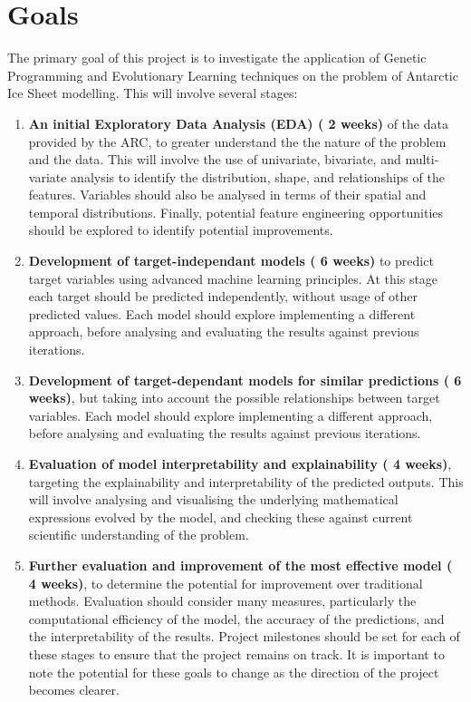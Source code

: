 \section{Goals}
The primary goal of this project is to investigate the application of Genetic Programming and Evolutionary Learning techniques on the problem of Antarctic Ice Sheet modelling. This will involve several stages: 

\begin{enumerate}
    \item \textbf{An initial Exploratory Data Analysis (EDA)  ( 2 weeks)} of the data provided by the ARC, to greater understand the the nature of the problem and the data. This will involve the use of univariate, bivariate, and multi-variate analysis to identify the distribution, shape, and relationships of the features. Variables should also be analysed in terms of their spatial and temporal distributions. Finally, potential feature engineering opportunities should be explored to identify potential improvements. 

    \item \textbf{Development of target-independant models ( 6 weeks)} to predict target variables using advanced machine learning principles. At this stage each target should be predicted independently, without usage of other predicted values. Each model should explore implementing a different approach, before analysing and evaluating the results against previous iterations. 

    \item \textbf{Development of target-dependant models for similar predictions ( 6 weeks)}, but taking into account the possible relationships between target variables. Each model should explore implementing a different approach, before analysing and evaluating the results against previous iterations.

    \item \textbf{Evaluation of model interpretability and explainability ( 4 weeks)}, targeting the explainability and interpretability of the predicted outputs.  This will involve analysing and visualising the underlying mathematical expressions evolved by the model, and checking these against current scientific understanding of the problem.

    \item \textbf{Further evaluation and improvement of the most effective model ( 4 weeks)}, to determine the potential for improvement over traditional methods. Evaluation should consider many measures, particularly the computational efficiency of the model, the accuracy of the predictions, and the interpretability of the results. Project milestones should be set for each of these stages to ensure that the project remains on track. It is important to note the potential for these goals to change as the direction of the project becomes clearer. 
\end{enumerate}

